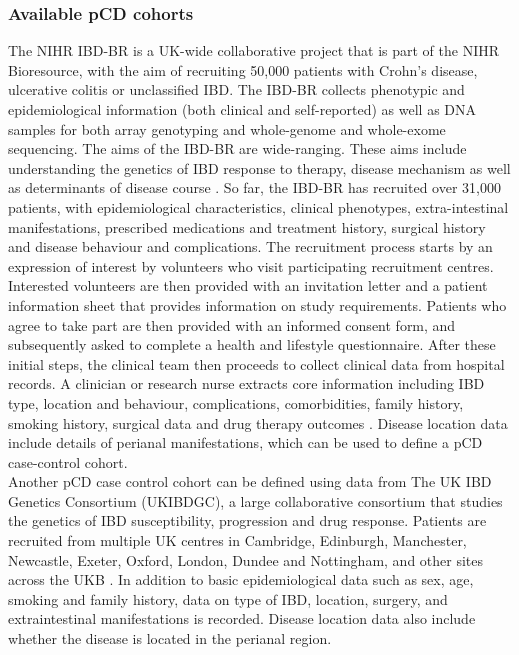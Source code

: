 \subsubsection{Available pCD cohorts}
The NIHR IBD-BR is a UK-wide collaborative project that is part of the NIHR Bioresource, with the aim of recruiting 50,000 patients with Crohn's disease, ulcerative colitis or unclassified IBD. The IBD-BR collects phenotypic and epidemiological information (both clinical and self-reported) as well as DNA samples for both array genotyping and whole-genome and whole-exome sequencing. The aims of the IBD-BR are wide-ranging. These aims include understanding the genetics of IBD response to therapy, disease mechanism as well as determinants of disease course \cite{ibdbr-protocol-v8,ibdbr-questionnaire-v7,ibdbr-further-info}. So far, the IBD-BR has recruited over 31,000 patients, with epidemiological characteristics, clinical phenotypes, extra-intestinal manifestations, prescribed medications and treatment history, surgical history and disease behaviour and complications. The recruitment process starts by an expression of interest by volunteers who visit participating recruitment centres. Interested volunteers are then provided with an invitation letter and a patient information sheet that provides information on study requirements. Patients who agree to take part are then provided with an informed consent form, and subsequently asked to complete a health and lifestyle questionnaire. After these initial steps, the clinical team then proceeds to collect clinical data from hospital records. A clinician or research nurse extracts core information including IBD type, location and behaviour, complications, comorbidities, family history, smoking history, surgical data and
drug therapy outcomes \cite{ibdbr-protocol-v8}. Disease location data include details of perianal manifestations, which can be used to define a pCD case-control cohort.\\

Another pCD case control cohort can be defined using data from The UK IBD Genetics Consortium (UKIBDGC), a large collaborative consortium that studies the genetics of IBD susceptibility, progression and drug response. Patients are recruited from multiple UK centres in Cambridge, Edinburgh, Manchester, Newcastle, Exeter, Oxford, London, Dundee and Nottingham, and other sites across the UKB \cite{ukibdgc-info}. In addition to basic epidemiological data such as sex, age, smoking and family history, data on type of IBD, location, surgery, and extraintestinal manifestations is recorded. Disease location data also include whether the disease is located in the perianal region.\\

